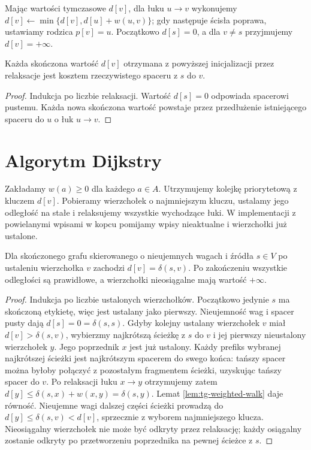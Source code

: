 \begin{definicja}
\label{def:tg-weighted-relax}
Mając wartości tymczasowe $d[v]$,
dla łuku $u\to v$ wykonujemy
$d[v]\gets\min\{d[v],d[u]+w(u,v)\}$;
gdy następuje ścisła poprawa, ustawiamy
rodzica $p[v]=u$.
Początkowo $d[s]=0$, a dla $v\ne s$
przyjmujemy $d[v]=+\infty$.
\end{definicja}

\begin{lemat}
\label{lem:tg-weighted-walk}
Każda skończona wartość $d[v]$
otrzymana z powyższej inicjalizacji
przez relaksacje jest kosztem
rzeczywistego spaceru z $s$ do $v$.
\end{lemat}
\begin{proof}
Indukcja po liczbie relaksacji.
Wartość $d[s]=0$ odpowiada spacerowi
pustemu. Każda nowa skończona wartość
powstaje przez przedłużenie istniejącego
spaceru do $u$ o łuk $u\to v$.
\end{proof}

\section{Algorytm Dijkstry}
\label{sec:tg-weighted-dijkstra}

Zakładamy $w(a)\geq0$ dla każdego $a\in A$.
Utrzymujemy kolejkę priorytetową z kluczem $d[v]$.
Pobieramy wierzchołek o najmniejszym kluczu,
ustalamy jego odległość na stałe i relaksujemy
wszystkie wychodzące łuki. W implementacji
z powielanymi wpisami w kopcu pomijamy
wpisy nieaktualne i wierzchołki już ustalone.

\begin{twierdzenie}
\label{thm:tg-weighted-dijkstra}
Dla skończonego grafu skierowanego
o nieujemnych wagach i źródła $s\in V$ po ustaleniu
wierzchołka $v$ zachodzi
$d[v]=\delta(s,v)$. Po zakończeniu
wszystkie odległości są prawidłowe,
a wierzchołki nieosiągalne mają
wartość $+\infty$.
\end{twierdzenie}
\begin{proof}
Indukcja po liczbie ustalonych wierzchołków.
Początkowo jedynie $s$ ma skończoną etykietę,
więc jest ustalany jako pierwszy. Nieujemność wag
i spacer pusty dają $d[s]=0=\delta(s,s)$.
Gdyby kolejny ustalany wierzchołek $v$
miał $d[v]>\delta(s,v)$, wybierzmy
najkrótszą ścieżkę z $s$ do $v$
i jej pierwszy nieustalony wierzchołek $y$.
Jego poprzednik $x$ jest już ustalony.
Każdy prefiks wybranej najkrótszej ścieżki jest
najkrótszym spacerem do swego końca: tańszy spacer
można byłoby połączyć z pozostałym fragmentem ścieżki,
uzyskując tańszy spacer do $v$.
Po relaksacji łuku $x\to y$ otrzymujemy zatem
$d[y]\leq\delta(s,x)+w(x,y)=\delta(s,y)$.
Lemat \ref{lem:tg-weighted-walk} daje
równość. Nieujemne wagi dalszej części
ścieżki prowadzą do
$d[y]\leq\delta(s,v)<d[v]$,
sprzecznie z wyborem najmniejszego
klucza. Nieosiągalny wierzchołek
nie może być odkryty przez relaksację;
każdy osiągalny zostanie odkryty
po przetworzeniu poprzednika na
pewnej ścieżce z $s$.
\end{proof}

